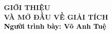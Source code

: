 \begin{frame}[noframenumbering]
    \thispagestyle{empty}
    \bfseries
    \begin{flushleft}
        \vfill
        \vspace{5mm}
        \textcolor{BlueDefault}{\huge \bfseries GIỚI THIỆU   \\ VÀ MỞ ĐẦU VỀ  GIẢI TÍCH} \\
        \vspace{8mm}
        \textcolor{black}{\large \bfseries Người trình bày: Võ Anh Tuệ }
        \vfill
    \end{flushleft}
\end{frame}